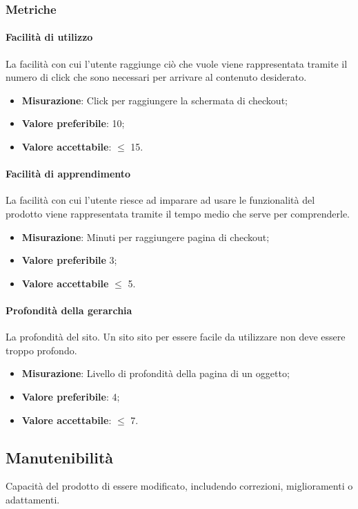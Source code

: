 		\subsubsection{Metriche}
			\paragraph{Facilità di utilizzo}
			La facilità con cui l'utente raggiunge ciò che vuole viene rappresentata tramite il numero di click che sono necessari per arrivare al contenuto desiderato.
			\begin{itemize}
			\item \textbf{Misurazione}: Click per raggiungere la schermata di checkout;
			\item \textbf{Valore preferibile}: 10;
			\item \textbf{Valore accettabile}: $\leq$ 15.
			\end{itemize}
			\paragraph{Facilità di apprendimento}
			La facilità con cui l'utente riesce ad imparare ad usare le funzionalità del prodotto viene rappresentata tramite il tempo medio che serve per comprenderle.
			\begin{itemize}
			\item \textbf{Misurazione}: Minuti per raggiungere pagina di checkout;
			\item \textbf{Valore preferibile} 3;
			\item\textbf{Valore accettabile} $\leq$ 5.
			\end{itemize}
			\paragraph{Profondità della gerarchia}
			La profondità del sito. Un sito sito per essere facile da utilizzare non deve essere troppo profondo.
			\begin{itemize}
			\item \textbf{Misurazione}: Livello di profondità della pagina di un oggetto;
			\item \textbf{Valore preferibile}: 4;
			\item \textbf{Valore accettabile}: $\leq$ 7.
			\end{itemize}
	\subsection{Manutenibilità}
	Capacità del prodotto di essere modificato, includendo correzioni, miglioramenti o adattamenti.

